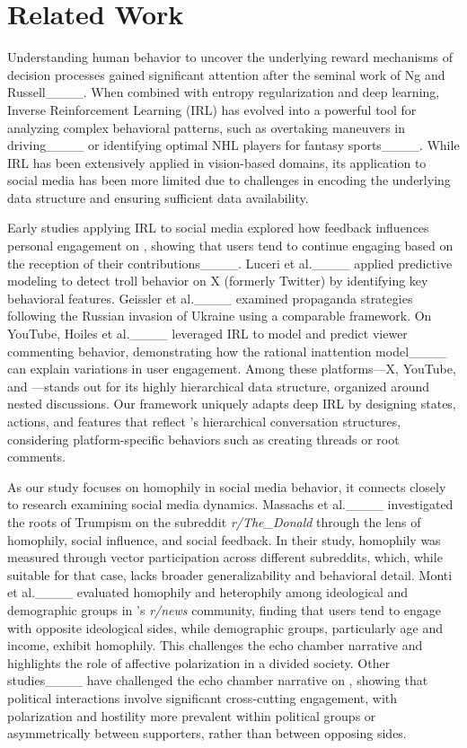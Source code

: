 \section{Related Work}
\label{subsec:related-work}




Understanding human behavior to uncover the underlying reward mechanisms of decision processes gained significant attention after the seminal work of Ng and Russell____. 
When combined with entropy regularization and deep learning, Inverse Reinforcement Learning (IRL) has evolved into a powerful tool for analyzing complex behavioral patterns, such as overtaking maneuvers in driving____ or identifying optimal NHL players for fantasy sports____. 
While IRL has been extensively applied in vision-based domains, its application to social media has been more limited due to challenges in encoding the underlying data structure and ensuring sufficient data availability.

Early studies applying IRL to social media explored how feedback influences personal engagement on \reddit, showing that users tend to continue engaging based on the reception of their contributions____. 
Luceri et al.____ applied predictive modeling to detect troll behavior on X (formerly Twitter) by identifying key behavioral features. Geissler et al.____ examined propaganda strategies following the Russian invasion of Ukraine using a comparable framework. 
On YouTube, Hoiles et al.____ leveraged IRL to model and predict viewer commenting behavior, demonstrating how the rational inattention model____ can explain variations in user engagement. Among these platforms---X, YouTube, and \reddit---\reddit stands out for its highly hierarchical data structure, organized around nested discussions. Our framework uniquely adapts deep IRL by designing states, actions, and features that reflect \reddit's hierarchical conversation structures, considering platform-specific behaviors such as creating threads or root comments.

As our study focuses on homophily in social media behavior, it connects closely to research examining social media dynamics. Massachs et al.____ investigated the roots of Trumpism on the subreddit \textit{r/The\_Donald} through the lens of homophily, social influence, and social feedback. In their study, homophily was measured through vector participation across different subreddits, which, while suitable for that case, lacks broader generalizability and behavioral detail. 
Monti et al.____ evaluated homophily and heterophily among ideological and demographic groups in \reddit's \textit{r/news} community, finding that users tend to engage with opposite ideological sides, while demographic groups, particularly age and income, exhibit homophily. This challenges the echo chamber narrative and highlights the role of affective polarization in a divided society. Other studies____ have challenged the echo chamber narrative on \reddit, showing that political interactions involve significant cross-cutting engagement, with polarization and hostility more prevalent within political groups or asymmetrically between supporters, rather than between opposing sides.

